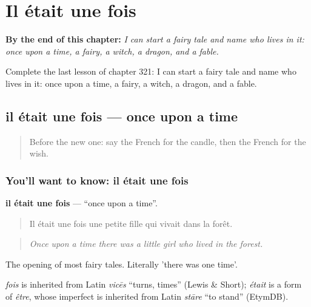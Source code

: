 
\chapter{Il était une fois}
\label{ch:fr-il-etait-une-fois}

\begin{chapteropening}
\textbf{By the end of this chapter:} \emph{I can start a fairy tale and name who lives in it: once upon a time, a fairy, a witch, a dragon, and a fable.}

Complete the last lesson of chapter 321: I can start a fairy tale and name who lives in it: once upon a time, a fairy, a witch, a dragon, and a fable.
\end{chapteropening}

\section[il était une fois]{il était une fois — once upon a time}

\label{lesson:FR-C321-il-etait-une-fois}



\begin{quote}
Before the new one: say the French for the candle, then the French for the wish.
\end{quote}

\subsection*{You'll want to know: il était une fois}
\textbf{il était une fois} — \textquotedblleft{}once upon a time\textquotedblright{}.

\begin{quote}
Il était une fois une petite fille qui vivait dans la forêt.
\end{quote}

\begin{quote}
\emph{Once upon a time there was a little girl who lived in the forest.}
\end{quote}

The opening of most fairy tales. Literally 'there was one time'.

\begin{cousinweb}
\emph{fois} is inherited from Latin \emph{vicēs} \textquotedblleft{}turns, times\textquotedblright{} (Lewis \& Short); \emph{était} is a form of \emph{être}, whose imperfect is inherited from Latin \emph{stāre} \textquotedblleft{}to stand\textquotedblright{} (EtymDB).
\end{cousinweb}

